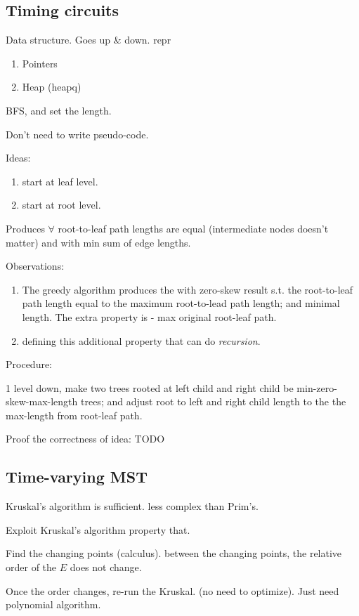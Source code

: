 \documentclass[a4paper]{report}
\begin{document}
\subsection{Timing circuits}
Data structure. Goes up \& down. repr
\begin{enumerate}
\item Pointers
\item Heap (heapq)
\end{enumerate}

BFS, and set the length. 

Don't need to write pseudo-code. 

Ideas:
\begin{enumerate}
\item start at leaf level. 
\item start at root level.
\end{enumerate}

Produces $\forall$ root-to-leaf path lengths are equal (intermediate nodes doesn't matter) and with min sum of edge lengths. 

Observations: 
\begin{enumerate}
\item The greedy algorithm produces the with zero-skew result s.t. the root-to-leaf path length equal to the maximum root-to-lead path length; and minimal length. The extra property is - max original root-leaf path. 
\item defining this additional property that can do \textit{recursion}.
\end{enumerate}

Procedure: 

1 level down, make two trees rooted at left child and right child be min-zero-skew-max-length trees; and adjust root to left and right child length to the the max-length from root-leaf path. 


Proof the correctness of idea: 
TODO

\subsection{Time-varying MST}
Kruskal's algorithm is sufficient. less complex than Prim's.

Exploit Kruskal's algorithm property that. 

Find the changing points (calculus). between the changing points, the relative order of the $E$ does not change. 

Once the order changes, re-run the Kruskal. (no need to optimize). Just need polynomial algorithm. 
\end{document}
